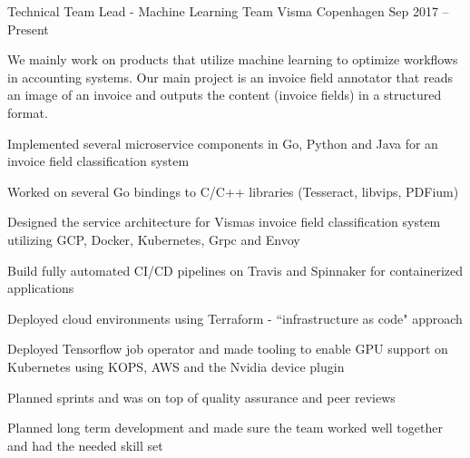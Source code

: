 

\begin{cventries}

  \cventry
    {Technical Team Lead - Machine Learning Team} %
    {Visma} %
    {Copenhagen} %
    {Sep 2017 – Present} %
    {
      We mainly work on products that utilize machine learning to optimize
      workflows in accounting systems. Our main project is an invoice field
      annotator that reads an image of an invoice and outputs the content
      (invoice fields) in a structured format.
      \vspace{6mm}
      \begin{cvitems} %
	\item {Implemented several microservice components in Go, Python and Java for an invoice field classification system}
	\item {Worked on several Go bindings to C/C++ libraries (Tesseract, libvips, PDFium)}
        \item {Designed the service architecture for Vismas invoice field classification system utilizing GCP, Docker, Kubernetes, Grpc and Envoy}
        \item {Build fully automated CI/CD pipelines on Travis and Spinnaker for containerized applications}
	\item {Deployed cloud environments using  Terraform - ``infrastructure as code" approach}
	\item {Deployed Tensorflow job operator and made tooling to enable GPU support on Kubernetes using KOPS, AWS and the Nvidia device plugin}
	\item {Planned sprints and was on top of quality assurance and peer reviews}
	\item {Planned long term development and made sure the team worked well together and had the needed skill set}
      \end{cvitems}
    }


\end{cventries}
